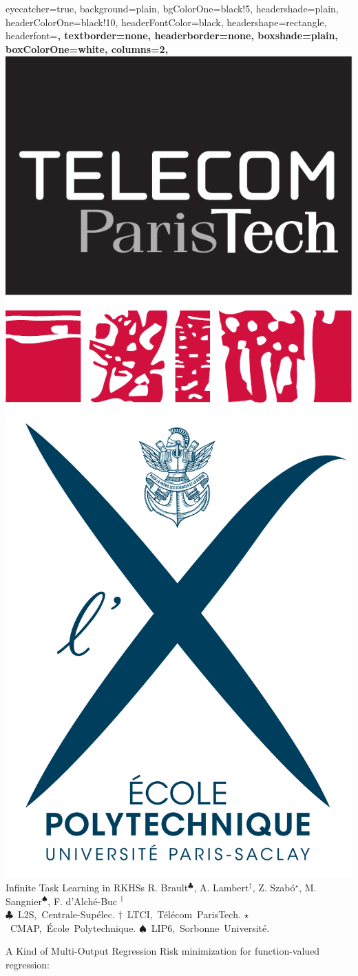 

%
\begin{poster}{
    eyecatcher=true,
    background=plain,
    bgColorOne=black!5,
    headershade=plain,
    headerColorOne=black!10,
    headerFontColor=black,
    headershape=rectangle,
    headerfont=\LARGE\bf,
    textborder=none,
    headerborder=none,
    boxshade=plain,
    boxColorOne=white,
    columns=2,
}
{
\includegraphics[height=10ex]{logos/tpt.pdf}
\includegraphics[height=10ex]{logos/x.jpg}
}
{
Infinite Task Learning in RKHSs
}
{
\def\PARISTECH{\unskip$^{\dagger}$}
\def\CMAP{\unskip$^{\star}$}
\def\LDS{\unskip$^{\clubsuit}$}
\def\LIP{\unskip$^{\spadesuit}$}
  \large
    R. Brault\LDS,
    A. Lambert\PARISTECH,
    Z. Szab{\'o}\CMAP,
    M. Sangnier\LIP,
    F. d'Alch\'{e}-Buc \PARISTECH\\
   \mbox{$\clubsuit$ L2S,  Centrale-Sup{\'e}lec.}
   \mbox{$\dagger$ LTCI, T\'el\'ecom ParisTech.}
   \mbox{$\star$ CMAP,  {\'E}cole Polytechnique.}
   \mbox{$\spadesuit$ LIP6, Sorbonne Universit\'{e}.}
}\par
%
%
\begin{posterbox}[name=parametrized_tasks, column=0]{A Kind of Multi-Output Regression}
Risk minimization for function-valued regression:
\end{posterbox}
\end{poster}
